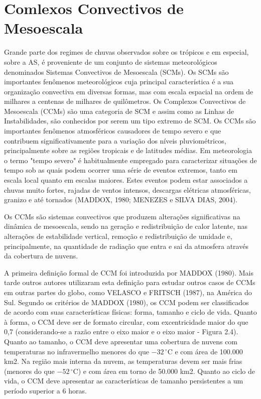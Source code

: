 \section{Comlexos Convectivos de Mesoescala}
\label{ss:ccm}

Grande parte dos regimes de chuvas observados sobre os trópicos e em especial, sobre a AS, é proveniente de um conjunto de sistemas meteorológicos denominados Sistemas Convectivos de Mesoescala (SCMs). Os SCMs são importantes fenômenos meteorológicos cuja principal característica é a sua organização convectiva em diversas formas, mas com escala espacial na ordem de milhares a centenas de milhares de quilômetros.
Os Complexos Convectivos de Mesoescala (CCMs) são uma categoria de SCM e assim como as Linhas de Instabilidades, são conhecidos por serem um tipo extremo de SCM. Os CCMs são importantes fenômenos atmosféricos causadores de tempo severo e que contribuem significativamente para a variação dos níveis pluviométricos, principalmente sobre as regiões tropicais e de latitudes médias. Em meteorologia o termo "tempo severo" é habitualmente empregado para caracterizar situações de tempo sob as quais podem ocorrer uma série de eventos extremos, tanto em escala local quanto em escalas maiores. Estes eventos podem estar associados a chuvas muito fortes, rajadas de ventos intensos, descargas elétricas atmosféricas, granizo e até tornados (MADDOX, 1980; MENEZES e SILVA DIAS, 2004).

Os CCMs são sistemas convectivos que produzem alterações significativas na dinâmica de mesoescala, sendo na geração e redistribuição de calor latente, nas alterações de estabilidade vertical, remoção e redistribuição de umidade e, principalmente, na quantidade de radiação que entra e sai da atmosfera através da cobertura de nuvens.

A primeira definição formal de CCM foi introduzida por MADDOX (1980). Mais tarde outros autores utilizaram esta definição para estudar outros casos de CCMs em outras partes do globo, como VELASCO e FRITSCH (1987), na América do Sul. Segundo os critérios de MADDOX (1980), os CCM podem ser classificados de acordo com suas características físicas: forma, tamanho e ciclo de vida. Quanto à forma, o CCM deve ser de formato circular, com excentricidade maior do que 0,7 (considerando-se a razão entre o eixo maior e o eixo maior - Figura 2.4). Quanto ao tamanho, o CCM deve apresentar uma cobertura de nuvens com temperaturas no infravermelho menores do que $-32\,^{\circ}\mathrm{C}$ e com área de 100.000 km2. Na região mais interna da nuvem, as temperaturas devem ser mais frias (menores do que $-52\,^{\circ}\mathrm{C}$) e com área em torno de 50.000 km2. Quanto ao ciclo de vida, o CCM deve apresentar as características de tamanho persistentes a um período superior a 6 horas.

